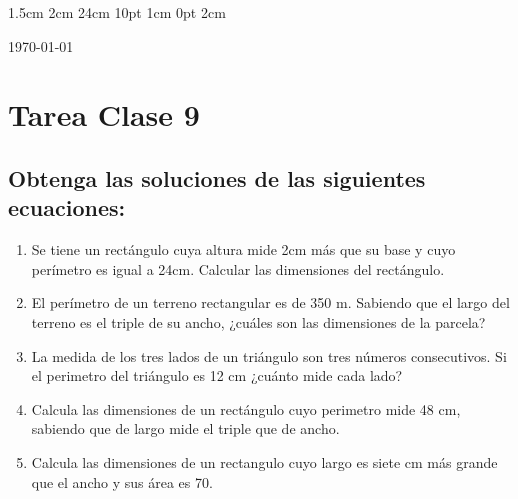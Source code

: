 \documentclass[12pt,letterpaper]{report}
\begin{document}
\setmargins{2.5cm}      
{1.5cm}                     
{2cm}  
{24cm}                    
{10pt}                          
{1cm}                          
{0pt}                             
{2cm}
\begin{flushright}
\today
\end{flushright}
\vspace{-1.75cm}
\section*{Tarea Clase 9}
\subsection*{Obtenga las soluciones de las siguientes ecuaciones:}
\begin{enumerate}
\item Se tiene un rectángulo cuya altura mide 2cm más que su base y cuyo perímetro es igual a 24cm. Calcular las dimensiones del rectángulo.
\item El perímetro de un terreno rectangular es de 350 m. Sabiendo que el largo del terreno es el triple de su ancho, ¿cuáles son las dimensiones de la parcela?
\item La medida de los tres lados de un triángulo son tres números consecutivos. Si el perimetro del triángulo es 12 cm ¿cuánto mide cada lado?
\item Calcula las dimensiones de un rectángulo cuyo perimetro mide 48 cm, sabiendo que de largo mide el triple que de ancho.
\item Calcula las dimensiones de un rectangulo cuyo largo es siete cm más grande que el ancho y sus área es 70.
\end{enumerate}
\end{document}
